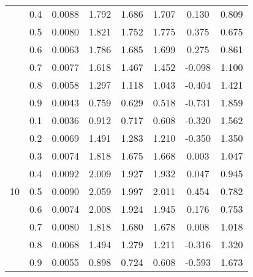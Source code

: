 \documentclass[11pt,a4paper]{report}
\begin{document}
\begin{longtable}{ | c | c || c | c | c | c | c | c | }
 & 0.4 & 0.0088 & 1.792 & 1.686 & 1.707 & 0.130 & 0.809 \\
 & 0.5 & 0.0080 & 1.821 & 1.752 & 1.775 & 0.375 & 0.675 \\
 & 0.6 & 0.0063 & 1.786 & 1.685 & 1.699 & 0.275 & 0.861 \\
 & 0.7 & 0.0077 & 1.618 & 1.467 & 1.452 & -0.098 & 1.100 \\
 & 0.8 & 0.0058 & 1.297 & 1.118 & 1.043 & -0.404 & 1.421 \\
 & 0.9 & 0.0043 & 0.759 & 0.629 & 0.518 & -0.731 & 1.859 \\
 \hline
\multirow{9}{*}{10} & 0.1 & 0.0036 & 0.912 & 0.717 & 0.608 & -0.320 & 1.562 \\
 & 0.2 & 0.0069 & 1.491 & 1.283 & 1.210 & -0.350 & 1.350 \\
 & 0.3 & 0.0074 & 1.818 & 1.675 & 1.668 & 0.003 & 1.047 \\
 & 0.4 & 0.0092 & 2.009 & 1.927 & 1.932 & 0.047 & 0.945 \\
 & 0.5 & 0.0090 & 2.059 & 1.997 & 2.011 & 0.454 & 0.782 \\
 & 0.6 & 0.0074 & 2.008 & 1.924 & 1.945 & 0.176 & 0.753 \\
 & 0.7 & 0.0080 & 1.818 & 1.680 & 1.678 & 0.008 & 1.018 \\
 & 0.8 & 0.0068 & 1.494 & 1.279 & 1.211 & -0.316 & 1.320 \\
 & 0.9 & 0.0055 & 0.898 & 0.724 & 0.608 & -0.593 & 1.673 \\
 \hline
\hline
\end{longtable}
\end{document}
